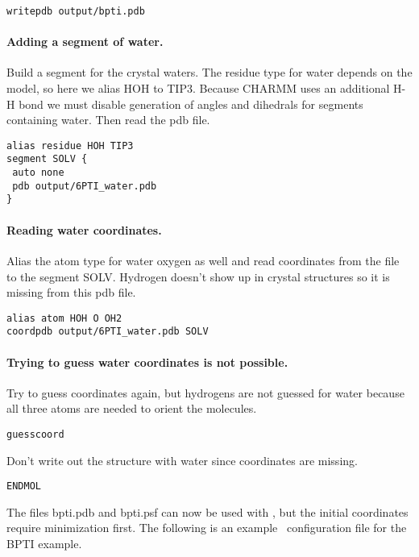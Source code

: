 \begin{verbatim}
writepdb output/bpti.pdb
\end{verbatim}

\paragraph*{Adding a segment of water.}


Build a segment for the crystal waters.  The residue type for water
depends on the model, so here we alias HOH to TIP3.  Because CHARMM
uses an additional H-H bond we must disable generation of angles and
dihedrals for segments containing water.  Then read the pdb file.

\begin{verbatim}
alias residue HOH TIP3
segment SOLV {
 auto none
 pdb output/6PTI_water.pdb
}
\end{verbatim}

\paragraph*{Reading water coordinates.}


Alias the atom type for water oxygen as well and read coordinates from
the file to the segment SOLV.  Hydrogen doesn't show up in crystal
structures so it is missing from this pdb file.

\begin{verbatim}
alias atom HOH O OH2
coordpdb output/6PTI_water.pdb SOLV
\end{verbatim}

\paragraph*{Trying to guess water coordinates is not possible.}


Try to guess coordinates again, but hydrogens are not guessed for water
because all three atoms are needed to orient the molecules.

\begin{verbatim}
guesscoord
\end{verbatim}


Don't write out the structure with water since coordinates are missing.

\begin{verbatim}
ENDMOL
\end{verbatim}


The files bpti.pdb and bpti.psf can now be used with \NAMD, but the
initial coordinates require minimization first.
The following is an example \NAMD\ configuration file for the BPTI example.

